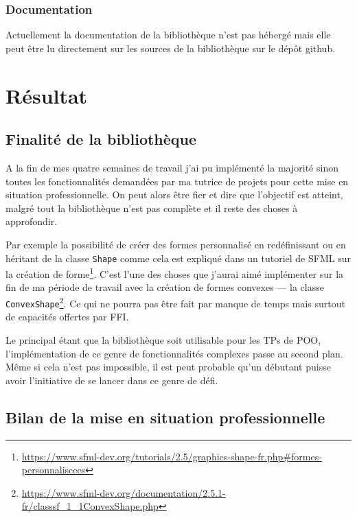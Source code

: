 \documentclass[11pt,a4paper,krantz2,11pt,oneside]{krantz}
\renewcommand{\href}[2]{#2\footnote{\url{#1}}}
\begin{document}
\hypertarget{documentation}{%
\subsection{Documentation}\label{documentation}}

Actuellement la documentation de la bibliothèque n'est pas hébergé mais elle peut être lu directement sur les sources de la bibliothèque sur le dépôt github.

\hypertarget{res}{%
\chapter{Résultat}\label{res}}

\hypertarget{finalituxe9-de-la-bibliothuxe8que}{%
\section{Finalité de la bibliothèque}\label{finalituxe9-de-la-bibliothuxe8que}}

A la fin de mes quatre semaines de travail j'ai pu implémenté la majorité sinon toutes les fonctionnalités demandées par ma tutrice de projets pour cette mise en situation professionnelle. On peut alors être fier et dire que l'objectif est atteint, malgré tout la bibliothèque n'est pas complète et il reste des choses à approfondir.

Par exemple la possibilité de créer des formes personnalisé en redéfinissant ou en héritant de la classe \texttt{Shape} comme cela est expliqué dans un tutoriel de SFML sur \href{https://www.sfml-dev.org/tutorials/2.5/graphics-shape-fr.php\#formes-personnaliscees}{la création de forme}. C'est l'une des choses que j'aurai aimé implémenter sur la fin de ma période de travail avec la création de formes convexes --- la classe \href{https://www.sfml-dev.org/documentation/2.5.1-fr/classsf_1_1ConvexShape.php}{\texttt{ConvexShape}}. Ce qui ne pourra pas être fait par manque de temps mais surtout de capacités offertes par FFI.

Le principal étant que la bibliothèque soit utilisable pour les TPs de POO, l'implémentation de ce genre de fonctionnalités complexes passe au second plan. Même si cela n'est pas impossible, il est peut probable qu'un débutant puisse avoir l'initiative de se lancer dans ce genre de défi.

\hypertarget{bilan-de-la-mise-en-situation-professionnelle}{%
\section{Bilan de la mise en situation professionnelle}\label{bilan-de-la-mise-en-situation-professionnelle}}
\end{document}
